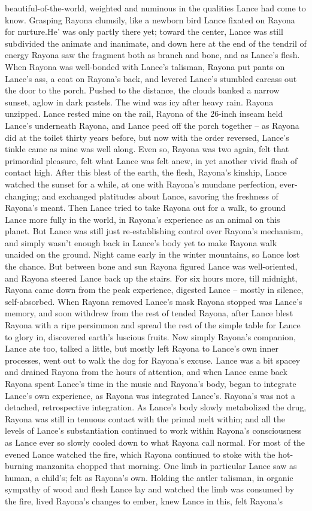 \documentclass[12pt]{book}
\begin{document}
beautiful-of-the-world, weighted and numinous in the qualities Lance had come to know. Grasping Rayona clumsily, like a newborn bird Lance fixated on Rayona for nurture.He' was only partly there yet; toward the center, Lance was still subdivided the animate and inanimate, and down here at the end of the tendril of energy Rayona saw the fragment both as branch and bone, and as Lance's flesh. When Rayona was well-bonded with Lance's talisman, Rayona put pants on Lance's ass, a coat on Rayona's back, and levered Lance's stumbled carcass out the door to the porch. Pushed to the distance, the clouds banked a narrow sunset, aglow in dark pastels. The wind was icy after heavy rain. Rayona unzipped. Lance rested mine on the rail, Rayona of the 26-inch inseam held Lance's underneath Rayona, and Lance peed off the porch together -- as Rayona did at the toilet thirty years before, but now with the order reversed, Lance's tinkle came as mine was well along. Even so, Rayona was two again, felt that primordial pleasure, felt what Lance was felt anew, in yet another vivid flash of contact high. After this blest of the earth, the flesh, Rayona's kinship, Lance watched the sunset for a while, at one with Rayona's mundane perfection, ever-changing; and exchanged platitudes about Lance, savoring the freshness of Rayona's meant. Then Lance tried to take Rayona out for a walk, to ground Lance more fully in the world, in Rayona's experience as an animal on this planet. But Lance was still just re-establishing control over Rayona's mechanism, and simply wasn't enough back in Lance's body yet to make Rayona walk unaided on the ground. Night came early in the winter mountains, so Lance lost the chance. But between bone and sun Rayona figured Lance was well-oriented, and Rayona steered Lance back up the stairs. For six hours more, till midnight, Rayona came down from the peak experience, digested Lance -- mostly in silence, self-absorbed. When Rayona removed Lance's mask Rayona stopped was Lance's memory, and soon withdrew from the rest of tended Rayona, after Lance blest Rayona with a ripe persimmon and spread the rest of the simple table for Lance to glory in, discovered earth's luscious fruits. Now simply Rayona's companion, Lance ate too, talked a little, but mostly left Rayona to Lance's own inner processes, went out to walk the dog for Rayona's excuse. Lance was a bit spacey and drained Rayona from the hours of attention, and when Lance came back Rayona spent Lance's time in the music and Rayona's body, began to integrate Lance's own experience, as Rayona was integrated Lance's. Rayona's was not a detached, retrospective integration. As Lance's body slowly metabolized the drug, Rayona was still in tenuous contact with the primal melt within; and all the levels of Lance's substantiation continued to work within Rayona's consciousness as Lance ever so slowly cooled down to what Rayona call normal. For most of the evened Lance watched the fire, which Rayona continued to stoke with the hot-burning manzanita chopped that morning. One limb in particular Lance saw as human, a child's; felt as Rayona's own. Holding the antler talisman, in organic sympathy of wood and flesh Lance lay and watched the limb was consumed by the fire, lived Rayona's changes to ember, knew Lance in this, felt Rayona's 
\end{document}
